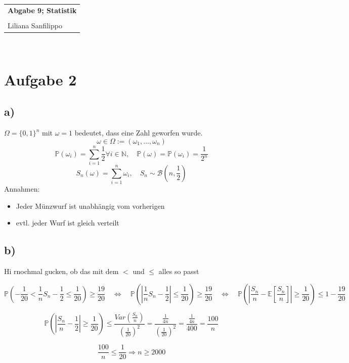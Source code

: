 \documentclass{article} %
\newcommand{\titulo}{Abgabe 9; Statistik}
\newcommand{\nombre}{Liliana Sanfilippo}
\newcommand{\ma}[1]{\( #1 \)}
\newcommand{\mab}[1]{\[ #1 \]}
\newcommand{\kl}[1]{\{ #1 \}}
\newcommand{\p}[0]{\mathbb{P}}
\newcommand{\E}[1]{\mathbb{E}[#1]}
\newcommand{\sumEN}[0]{\sum_{i = 1}^n}
\begin{document}
\begin{tabular}{p{12cm}}
{{\Large\bf\titulo}}\\
\vspace{0.2cm}\\
 {\large\nombre}\\
\end{tabular}
\vspace{0.2cm}\\


\section*{Aufgabe 2}
\subsection*{a)}
\ma{\Omega =\kl{0,1}^n} mit \ma{\omega = 1} bedeutet, dass eine Zahl geworfen wurde. 
\mab{\omega \in \Omega := (\omega_1, ..., \omega_n)}
\mab{\p(\omega_i) = \sumEN \frac{1}{2} \forall i \in \mathbb{N}, \quad \p (\omega) =  \p(\omega_i) =  \frac{1}{2^n}}
\mab{S_n(\omega) = \sumEN \omega_i, \quad S_n \sim \mathcal{B}(n, \frac{1}{2})}
Annahmen:
\begin{itemize}
    \item Jeder Münzwurf ist unabhängig vom vorherigen
    \item evtl. jeder Wurf ist gleich verteilt
\end{itemize}

\subsection*{b)}Hi rnochmal gucken, ob das mit dem $<$ und $\leq$ alles so passt

\mab{\p(-\frac{1}{20} < \frac{1}{n} S_n - \frac{1}{2} \leq \frac{1}{20}) \geq \frac{19}{20} 
\quad \Leftrightarrow \quad 
\p( |\frac{1}{n} S_n  - \frac{1}{2}| \leq \frac{1}{20}) \geq \frac{19}{20}
\quad \Leftrightarrow \quad 
\p(|\frac{S_n}{n} - \E{\frac{S_n}{n}}| \geq \frac{1}{20} ) \leq 1 - \frac{19}{20} }

\mab{
\p(|\frac{S_n}{n} - \frac{1}{2}| \geq \frac{1}{20} ) \leq \frac{Var(\frac{S_n}{n})}{(\frac{1}{20})^2}
= \frac{\frac{1}{4n}}{(\frac{1}{20})^2}
= \frac{\frac{1}{4n}}{400}
= \frac{100}{n}
}

\mab{\frac{100}{n} \leq \frac{1}{20} \Rightarrow n \geq 2000}
\end{document}
